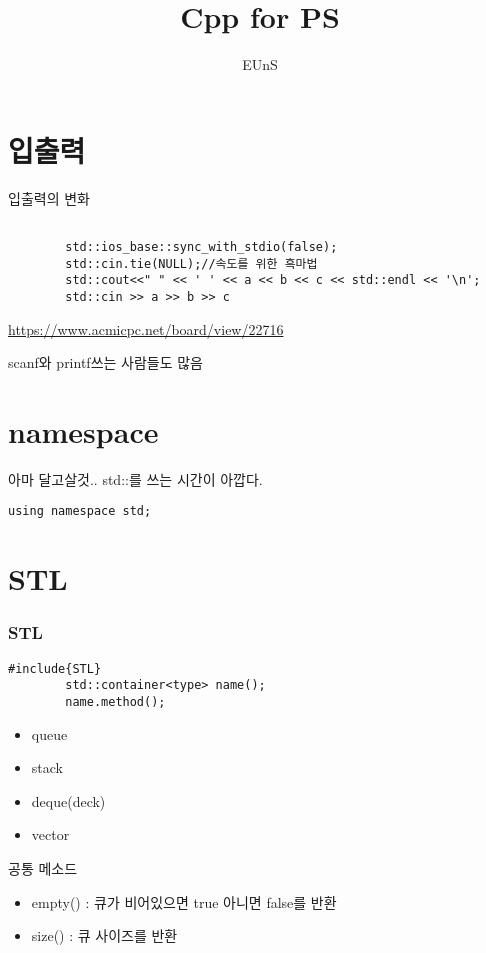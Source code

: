 \documentclass[10pt]{beamer}
\title{Cpp for PS}
\author{EUnS}
\begin{document}
\begin{frame}
  \maketitle
\end{frame}

\section{입출력}

\begin{frame}[fragile]{입출력의 변화}
    \begin{lstlisting}[style = CStyle]
    
        std::ios_base::sync_with_stdio(false); 
        std::cin.tie(NULL);//속도를 위한 흑마법
        std::cout<<" " << ' ' << a << b << c << std::endl << '\n';
        std::cin >> a >> b >> c 
    \end{lstlisting}
    \url{https://www.acmicpc.net/board/view/22716}

    scanf와 printf쓰는 사람들도 많음
\end{frame}

\section{namespace}

\begin{frame}[fragile]{아마 달고살것..}
    std::를 쓰는 시간이 아깝다.

    \begin{lstlisting}[style = CStyle]
        using namespace std;
    \end{lstlisting}
        
\end{frame}

\section{STL}

\begin{frame}[fragile]
    \frametitle{STL}
    
    \begin{lstlisting}[style = CStyle]
        #include{STL}
        std::container<type> name();
        name.method();
    \end{lstlisting}

    \begin{itemize}
        \item queue
        \item stack
        \item deque(deck)
        \item vector
    \end{itemize}
    공통 메소드
    \begin{itemize}
        \item empty() : 큐가 비어있으면 true 아니면 false를 반환
        \item size() : 큐 사이즈를 반환
    \end{itemize}
\end{frame}
\end{document}
